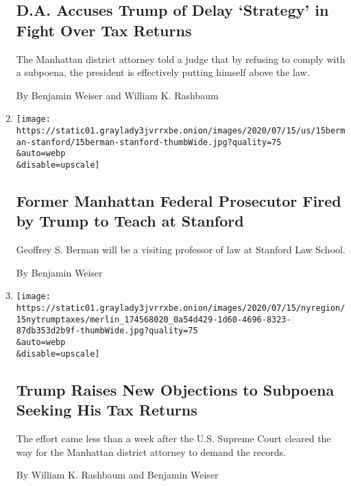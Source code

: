 \begin{enumerate}
{  \subsection{D.A. Accuses Trump of Delay `Strategy' in Fight Over Tax
  Returns}\label{da-accuses-trump-of-delay-strategy-in-fight-over-tax-returns}}

  The Manhattan district attorney told a judge that by refusing to
  comply with a subpoena, the president is effectively putting himself
  above the law.

  By Benjamin Weiser and William K. Rashbaum
\item
  \href{/2020/07/15/us/Geoffrey-Berman-fired-stanford.html}{}

  \texttt{[image: https://static01.graylady3jvrrxbe.onion/images/2020/07/15/us/15berman-stanford/15berman-stanford-thumbWide.jpg?quality=75\\\&auto=webp\\\&disable=upscale]}

  \hypertarget{former-manhattan-federal-prosecutor-fired-by-trump-to-teach-at-stanford}{%
  \subsection{Former Manhattan Federal Prosecutor Fired by Trump to
  Teach at
  Stanford}\label{former-manhattan-federal-prosecutor-fired-by-trump-to-teach-at-stanford}}

  Geoffrey S. Berman will be a visiting professor of law at Stanford Law
  School.

  By Benjamin Weiser
\item
  \href{/2020/07/15/nyregion/donald-trump-taxes-cyrus-vance.html}{}

  \texttt{[image: https://static01.graylady3jvrrxbe.onion/images/2020/07/15/nyregion/15nytrumptaxes/merlin\_174568020\_0a54d429-1d60-4696-8323-87db353d2b9f-thumbWide.jpg?quality=75\\\&auto=webp\\\&disable=upscale]}

  \hypertarget{trump-raises-new-objections-to-subpoena-seeking-his-tax-returns}{%
  \subsection{Trump Raises New Objections to Subpoena Seeking His Tax
  Returns}\label{trump-raises-new-objections-to-subpoena-seeking-his-tax-returns}}

  The effort came less than a week after the U.S. Supreme Court cleared
  the way for the Manhattan district attorney to demand the records.

  By William K. Rashbaum and Benjamin Weiser
\end{enumerate}

